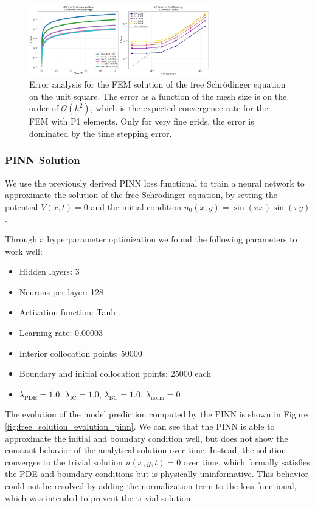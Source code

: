 \documentclass{article}
\theoremstyle{definition}
\theoremstyle{plain}
\theoremstyle{remark}
\begin{document}
\begin{figure}[h!]
  \centering
  \includegraphics[width=0.7\textwidth, trim=19cm 0cm 0cm 0cm, clip]{figures/2d_error_analysis.png}
  \caption{Error analysis for the FEM solution of the free Schrödinger equation on the unit square. The error as a function of the mesh size is on the order of $\mathcal{O}(h^2)$, which is the expected convergence rate for the FEM with P1 elements. Only for very fine grids, the error is dominated by the time stepping error.}
  \label{fig:2d_error_analysis_2}
\end{figure}

\subsubsection*{PINN Solution}

We use the previously derived PINN loss functional to train a neural network to approximate the solution of the free Schrödinger equation, by setting the potential \( V(x,t) = 0 \) and the initial condition \( u_0(x,y) = \sin(\pi x)\sin(\pi y) \).

Through a hyperparameter optimization we found the following parameters to work well:

\begin{itemize}
  \item Hidden layers: 3
  \item Neurons per layer: 128
  \item Activation function: Tanh
  \item Learning rate: 0.00003
  \item Interior collocation points: 50000
  \item Boundary and initial collocation points: 25000 each
  \item $\lambda_{\mathrm{PDE}} = 1.0$, $\lambda_{\mathrm{IC}} = 1.0$, $\lambda_{\mathrm{BC}} = 1.0$, $\lambda_{\mathrm{norm}} = 0$
\end{itemize}

The evolution of the model prediction computed by the PINN is shown in Figure \ref{fig:free_solution_evolution_pinn}.
We can see that the PINN is able to approximate the initial and boundary condition well, but does not show the constant behavior of the analytical solution over time.
Instead, the solution converges to the trivial solution \( u(x,y,t) = 0 \) over time, which formally satisfies the PDE and boundary conditions but is physically uninformative.
This behavior could not be resolved by adding the normalization term to the loss functional, which was intended to prevent the trivial solution.
\end{document}
